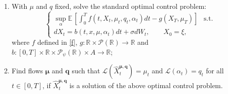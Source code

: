 \documentclass[11pt]{article}
\theoremstyle{definition}
\begin{document}
\begin{enumerate}
    \item With $\mu$ and $q$ fixed, solve the standard optimal control problem:
    \begin{equation}
        \left\{ \begin{array}{lcc}\displaystyle 
             \sup_{\alpha} \mathbb{E}\,\left[\int_0^T f(t, X_t, \mu_t, q_t, \alpha_t) dt - g(X_T, \mu_T) \right] & \text{s.t.} \\
              dX_t = b(t, x, \mu, \alpha_t) dt + \sigma dW_t, \qquad X_0 = \xi, &
             \end{array}
   \right.
   \end{equation}
   where $f$ defined in \eqref{f},  $g : \mathbb{R} \times \mathcal{P}(\mathbb{R}) \to \mathbb{R}$ and $b : [0,T] \times \mathbb{R} \times \mathcal{P}_{\psi}(\mathbb{R}) \times A \to \mathbb{R}$;
   \item Find flows $\bm{\mu}$ and $\bm{q}$ such that $\mathcal{L}(\hat{X}^{\bm{\mu}, \bm{q}}_t)=\mu_t$ and $\mathcal{L}(\alpha_t)=q_t$ for all $t\in [0,T]$, if $\hat{X}^{\bm{\mu}, \bm{q}}_t$ is a solution of the above optimal control problem.
\end{enumerate}
\end{document}
